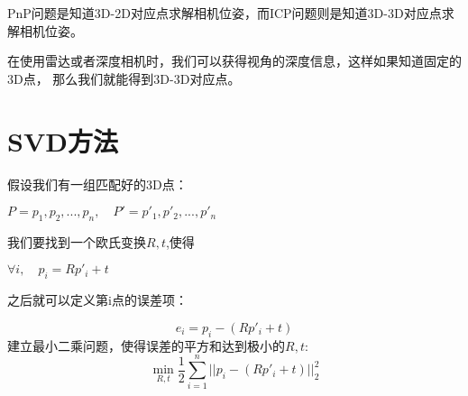 PnP问题是知道3D-2D对应点求解相机位姿，而ICP问题则是知道3D-3D对应点求解相机位姿。

在使用雷达或者深度相机时，我们可以获得视角的深度信息，这样如果知道固定的3D点，
那么我们就能得到3D-3D对应点。

\section{SVD方法}
假设我们有一组匹配好的3D点：
\begin{center}
$P = {p_1, p_2,..., p_n} , \quad P' = {p'_1, p'_2,..., p'_n}$
\end{center}
我们要找到一个欧氏变换$R,t$,使得
\begin{center}
$\forall i, \quad p_i = R p'_i + t$
\end{center}
之后就可以定义第i点的误差项：

\begin{equation}
    e_i = p_i - (R p'_i + t)
\end{equation}
建立最小二乘问题，使得误差的平方和达到极小的$R,t$:
\begin{equation}
\min \limits_{R,t} \frac{1}{2} \sum_{i=1}^n ||p_i - (R p'_i + t)||_2^2
\end{equation}

